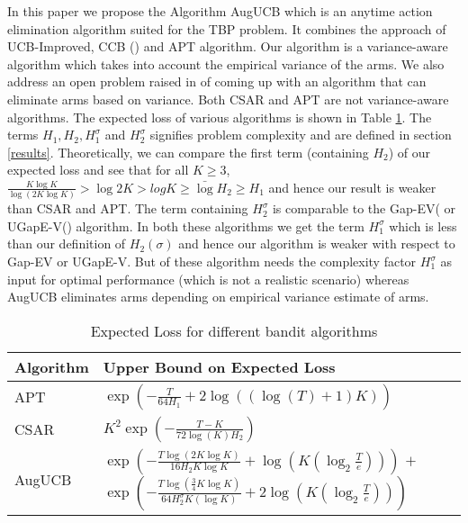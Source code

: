 In this paper we propose the Algorithm AugUCB which is an anytime action elimination algorithm suited for the TBP problem. It combines the approach of UCB-Improved, CCB (\cite{liu2016modification}) and APT algorithm. Our algorithm is a variance-aware algorithm which takes into account the empirical variance of the arms. We also address an open problem raised in \cite{auer2010ucb} of coming up with an algorithm that can eliminate arms based on variance. Both CSAR and APT are not variance-aware algorithms. The expected loss of various algorithms is shown in Table \ref{tab:regret-bds}.  The terms $H_1, H_2, H_1^{\sigma}$ and $H_2^{\sigma}$ signifies problem complexity and are defined in section \ref{results}. Theoretically, we can compare the first term (containing $H_2$) of our expected loss and see that for all $K\geq 3$, $\frac{K\log K}{\log(2K \log K)} > \log 2K > log K \geq \bar{\log} H_2\geq H_1$ and hence our result is weaker than CSAR and APT. The term containing $H_2^{\sigma}$ is comparable to the Gap-EV(\cite{gabillon2011multi} or UGapE-V(\cite{gabillon2012best}) algorithm. In both these algorithms we get the term $H_1^{\sigma}$ which is less than our definition of $H_2(\sigma)$ and hence our algorithm is weaker with respect to Gap-EV or UGapE-V. But of these algorithm needs the complexity factor $H_1^{\sigma}$ as input for optimal performance (which is not a realistic scenario) whereas AugUCB eliminates arms depending on empirical variance estimate of arms. 

\begin{table}[!h]
\caption{Expected Loss for different bandit algorithms}
\label{tab:regret-bds}
\begin{center}
\begin{tabular}{|p{1.3cm}|p{6.33cm}|}
\toprule
Algorithm  & Upper Bound on Expected Loss \\
\midrule
APT         &$\exp(-\frac{T}{64H_1}+2\log((\log(T)+1)K))$ \\\midrule
CSAR		&$K^2\exp(-\frac{T-K}{72\log(K)H_2})$ \\\midrule
AugUCB      &
$\exp\left( -\frac{T\log ( 2K\log K)}{ 16 H_2 K\log K} + \log\left(K\left(\log_2\frac{T}{e}\right)\right)\right)$\newline
 $+$\newline
 $ \exp\left(- \frac{T\log ( \frac{3}{4} K\log K)}{64H_{2}^{\sigma} K(\log K)}
 + 2\log\left(K\left(\log_2\frac{T}{e}\right)\right) \right) $
\\\bottomrule
\end{tabular}
\end{center}
\end{table}

